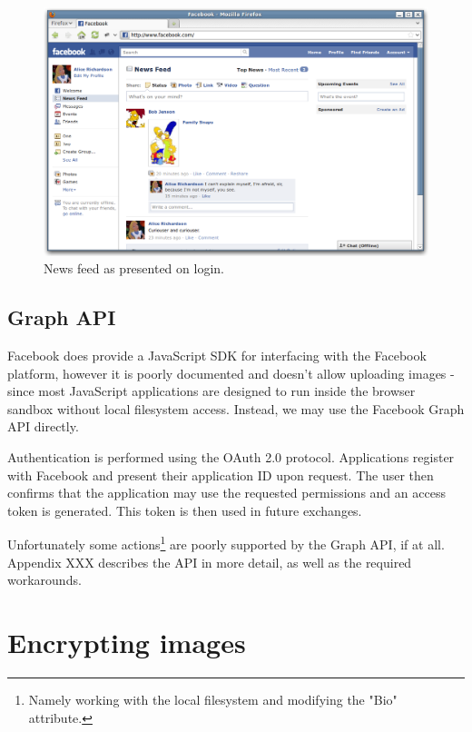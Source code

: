     \begin{figure}[tb]
        \begin{center}
                \includegraphics[width=12cm]{screens/facebook.png}
            \caption{News feed as presented on login.}
            \label{scn:fbook}
        \end{center}
    \end{figure}

\FloatBarrier
\subsection{Graph API}

Facebook does provide a JavaScript SDK for interfacing with the Facebook platform, however it is poorly documented and doesn't allow uploading images - since most JavaScript applications are designed to run inside the browser sandbox without local filesystem access. Instead, we may use the Facebook Graph API directly.

Authentication is performed using the OAuth 2.0 protocol. Applications register with Facebook and present their application ID upon request. The user then confirms that the application may use the requested permissions and an access token is generated. This token is then used in future exchanges.

Unfortunately some actions\footnote{Namely working with the local filesystem and modifying the "Bio" attribute.} are poorly supported by the Graph API, if at all. Appendix XXX describes the API in more detail, as well as the required workarounds.

    
\FloatBarrier
\section{Encrypting images}
\label{ssec:images}

